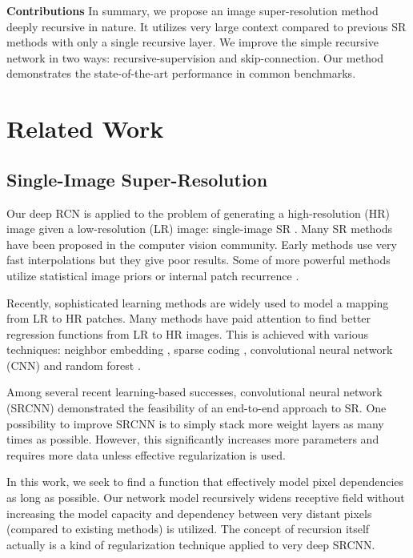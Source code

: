 \documentclass[10pt,twocolumn,letterpaper]{article}
\begin{document}
\textbf{Contributions} In summary, we propose an image super-resolution method deeply recursive in nature. It utilizes very large context compared to previous SR methods with only a single recursive layer. We improve the simple recursive network in two ways: recursive-supervision and skip-connection. Our method demonstrates the state-of-the-art performance in common benchmarks.

\section{Related Work}

\subsection{Single-Image Super-Resolution}

Our deep RCN is applied to the problem of generating a high-resolution (HR) image given a low-resolution (LR) image: single-image SR \cite{Irani1991, freeman2000learning,glasner2009super}. Many SR methods have been proposed in the computer vision community. Early methods use very fast interpolations but they give poor results. Some of more powerful methods utilize statistical image priors \cite{sun2008image,Kim2010} or internal patch recurrence \cite{glasner2009super, Huang-CVPR-2015}.

Recently, sophisticated learning methods are widely used to model a mapping from LR to HR patches. Many methods have paid attention to find better regression functions from LR to HR images. This is achieved with various techniques: neighbor embedding \cite{chang2004super,bevilacqua2012}, sparse coding \cite{yang2010image,zeyde2012single,Timofte2013,Timofte}, convolutional neural network (CNN) \cite{dong2014image} and random forest \cite{schulter2015fast}.

Among several recent learning-based successes,  convolutional neural network (SRCNN) \cite{dong2014image} demonstrated the feasibility of an end-to-end approach to SR. One possibility to improve SRCNN is to simply stack more weight layers as many times as possible. However, this significantly increases more parameters and requires more data unless effective regularization is used.  

In this work, we seek to find a function that effectively model pixel dependencies as long as possible. Our network model recursively widens receptive field without increasing the model capacity and dependency between very distant pixels (compared to existing methods) is utilized. The concept of recursion itself actually is a kind of regularization technique applied to very deep SRCNN. 
\end{document}
